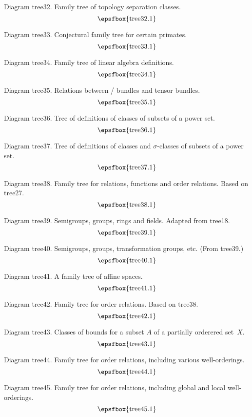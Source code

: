 Diagram tree32. Family tree of topology separation classes.
$$
\centerline{\epsfbox{tree32.1}}
$$

Diagram tree33. Conjectural family tree for certain primates.
$$
\centerline{\epsfbox{tree33.1}}
$$

Diagram tree34. Family tree of linear algebra definitions.
$$
\centerline{\epsfbox{tree34.1}}
$$

\filleject

Diagram tree35. Relations between \fibre/ bundles and tensor bundles.
$$
\centerline{\epsfbox{tree35.1}}
$$

Diagram tree36. Tree of definitions of classes of subsets of a power set.
$$
\centerline{\epsfbox{tree36.1}}
$$

Diagram tree37. Tree of definitions of classes and $\sigma$-classes of subsets
of a power set.
$$
\centerline{\epsfbox{tree37.1}}
$$

Diagram tree38. Family tree for relations, functions and order relations. Based
on tree27.
$$
\centerline{\epsfbox{tree38.1}}
$$

\filleject

Diagram tree39. Semigroups, groups, rings and fields. Adapted from tree18.
$$
\centerline{\epsfbox{tree39.1}}
$$

Diagram tree40. Semigroups, groups, transformation groups, etc. (From tree39.)
$$
\centerline{\epsfbox{tree40.1}}
$$

Diagram tree41. A family tree of affine spaces.
$$
\centerline{\epsfbox{tree41.1}}
$$

\filleject

Diagram tree42. Family tree for order relations. Based on tree38.
$$
\centerline{\epsfbox{tree42.1}}
$$

Diagram tree43. Classes of bounds for a subset $A$ of a partially orderered
set~$X$.
$$
\centerline{\epsfbox{tree43.1}}
$$

Diagram tree44. Family tree for order relations, including various
well-orderings.
$$
\centerline{\epsfbox{tree44.1}}
$$

Diagram tree45. Family tree for order relations, including global and local
well-orderings.
$$
\centerline{\epsfbox{tree45.1}}
$$

\filleject

